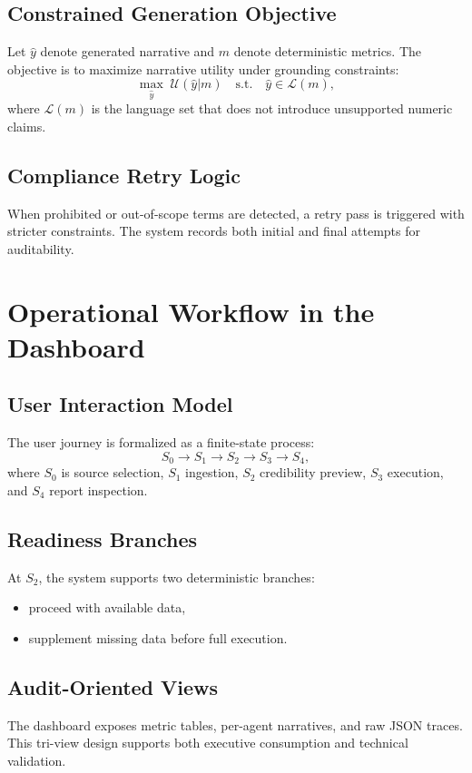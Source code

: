 \documentclass[conference]{IEEEtran}
\begin{document}
\subsection{Constrained Generation Objective}
Let $\hat{y}$ denote generated narrative and $m$ denote deterministic metrics. The objective is to maximize narrative utility under grounding constraints:
\begin{equation}
\max_{\hat{y}} \;\mathcal{U}(\hat{y}|m)\quad\text{s.t.}\quad\hat{y}\in\mathcal{L}(m),
\end{equation}
where $\mathcal{L}(m)$ is the language set that does not introduce unsupported numeric claims.

\subsection{Compliance Retry Logic}
When prohibited or out-of-scope terms are detected, a retry pass is triggered with stricter constraints. The system records both initial and final attempts for auditability.

\section{Operational Workflow in the Dashboard}
\subsection{User Interaction Model}
The user journey is formalized as a finite-state process:
\begin{equation}
S_0\rightarrow S_1\rightarrow S_2\rightarrow S_3\rightarrow S_4,
\end{equation}
where $S_0$ is source selection, $S_1$ ingestion, $S_2$ credibility preview, $S_3$ execution, and $S_4$ report inspection.

\subsection{Readiness Branches}
At $S_2$, the system supports two deterministic branches:
\begin{itemize}
    \item proceed with available data,
    \item supplement missing data before full execution.
\end{itemize}

\subsection{Audit-Oriented Views}
The dashboard exposes metric tables, per-agent narratives, and raw JSON traces. This tri-view design supports both executive consumption and technical validation.
\end{document}
